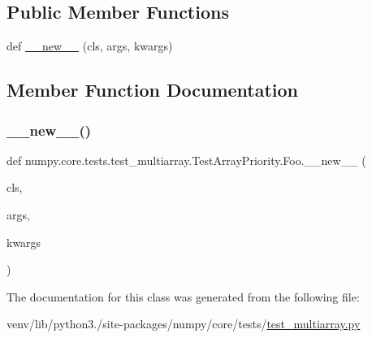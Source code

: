 \subsection*{Public Member Functions}
\begin{DoxyCompactItemize}
\item 
def \hyperlink{classnumpy_1_1core_1_1tests_1_1test__multiarray_1_1TestArrayPriority_1_1Foo_a8fa14d33bd307434763124821bede242}{\+\_\+\+\_\+new\+\_\+\+\_\+} (cls, args, kwargs)
\end{DoxyCompactItemize}


\subsection{Member Function Documentation}
\mbox{\label{classnumpy_1_1core_1_1tests_1_1test__multiarray_1_1TestArrayPriority_1_1Foo_a8fa14d33bd307434763124821bede242}} 
\subsubsection{\texorpdfstring{\+\_\+\+\_\+new\+\_\+\+\_\+()}{\_\_new\_\_()}}
{\footnotesize\ttfamily def numpy.\+core.\+tests.\+test\+\_\+multiarray.\+Test\+Array\+Priority.\+Foo.\+\_\+\+\_\+new\+\_\+\+\_\+ (\begin{DoxyParamCaption}\item[{}]{cls,  }\item[{}]{args,  }\item[{}]{kwargs }\end{DoxyParamCaption})}



The documentation for this class was generated from the following file\+:\begin{DoxyCompactItemize}
\item 
venv/lib/python3./site-\/packages/numpy/core/tests/\hyperlink{core_2tests_2test__multiarray_8py}{test\+\_\+multiarray.\+py}\end{DoxyCompactItemize}
